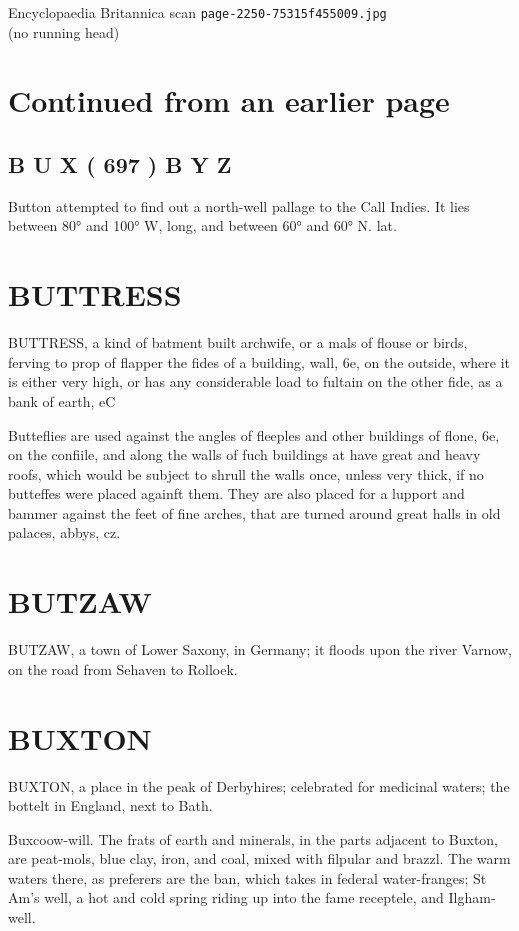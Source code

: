 \documentclass{article}
\begin{document}
\begin{center}
{\Large Encyclopaedia Britannica scan \texttt{page-2250-75315f455009.jpg}}\\[0.5em]
(no running head)
\end{center}
\section*{Continued from an earlier page}
\subsection*{B U X ( 697 ) B Y Z}
Button attempted to find out a north-well pallage to the Call Indies. It lies between 80° and 100° W, long, and between 60° and 60° N. lat.

\section*{BUTTRESS}
BUTTRESS, a kind of batment built archwife, or a mals of flouse or birds, ferving to prop of flapper the fides of a building, wall, 6e, on the outside, where it is either very high, or has any considerable load to fultain on the other fide, as a bank of earth, eC

Butteflies are used against the angles of fleeples and other buildings of flone, 6e, on the confiile, and along the walls of fuch buildings at have great and heavy roofs, which would be subject to shrull the walls once, unless very thick, if no butteffes were placed againft them. They are also placed for a lupport and bammer against the feet of fine arches, that are turned around great halls in old palaces, abbys, cz.

\section*{BUTZAW}
BUTZAW, a town of Lower Saxony, in Germany; it floods upon the river Varnow, on the road from Sehaven to Rolloek.

\section*{BUXTON}
BUXTON, a place in the peak of Derbyhires; celebrated for medicinal waters; the bottelt in England, next to Bath.

Buxcoow-will. The frats of earth and minerals, in the parts adjacent to Buxton, are peat-mols, blue clay, iron, and coal, mixed with filpular and brazzl. The warm waters there, as preferers are the ban, which takes in federal water-franges; St Am’s well, a hot and cold spring riding up into the fame receptele, and Ilgham-well.
\end{document}
